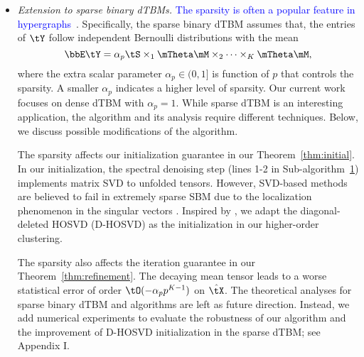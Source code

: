 \documentclass[lettersize,onecolumn,journal]{IEEEtran}
\theoremstyle{definition}
\theoremstyle{definition}
\begin{document}
{\begin{itemize}[wide]
{}

    
  \item \textit{Extension to sparse binary dTBMs.} \textcolor{blue}{The sparsity is often a popular feature in hypergraphs~\citep{florescu2016spectral,ke2019community, ahn2018hypergraph}}. Specifically, the sparse binary dTBM assumes that, the entries of $\tY$ follow independent Bernoulli distributions with the mean
     \begin{equation}\label{eq:sparse_dtbm}
    \bbE\tY = \alpha_p \tS \times_1 \mTheta \mM \times_2  \cdots \times_K \mTheta \mM,
\end{equation}
where the extra scalar parameter $\alpha_p \in (0,1]$ is function of $p$ that controls the sparsity. A smaller $\alpha_p$ indicates a higher level of sparsity. Our current work focuses on dense dTBM with $\alpha_p=1$.  While sparse dTBM is an interesting application, the algorithm and its analysis require different techniques. Below, we discuss possible modifications of the algorithm.


The sparsity affects our initialization guarantee in our Theorem~\ref{thm:initial}. In our initialization, the spectral denoising step (lines 1-2 in Sub-algorithm~\hyperref[alg:main]{1}) implements matrix SVD to unfolded tensors. %
However, SVD-based methods are believed to fail in extremely sparse SBM due to the localization phenomenon in the singular vectors \citep{florescu2016spectral}. Inspired by \cite{florescu2016spectral}, we adapt the diagonal-deleted HOSVD (D-HOSVD) \citep{ke2019community} as the initialization in our higher-order clustering. 

The sparsity also affects the iteration guarantee in our Theorem~\ref{thm:refinement}. The decaying mean tensor leads to a worse statistical error of order $\tO( -\alpha_p p^{K-1})$ on $\hat \tX$. The theoretical analyses for sparse binary dTBM and algorithms are left as future direction. Instead, we add numerical experiments to evaluate the robustness of our algorithm and the improvement of D-HOSVD initialization in the sparse dTBM; see Appendix I.



\end{itemize}}
\end{document}
